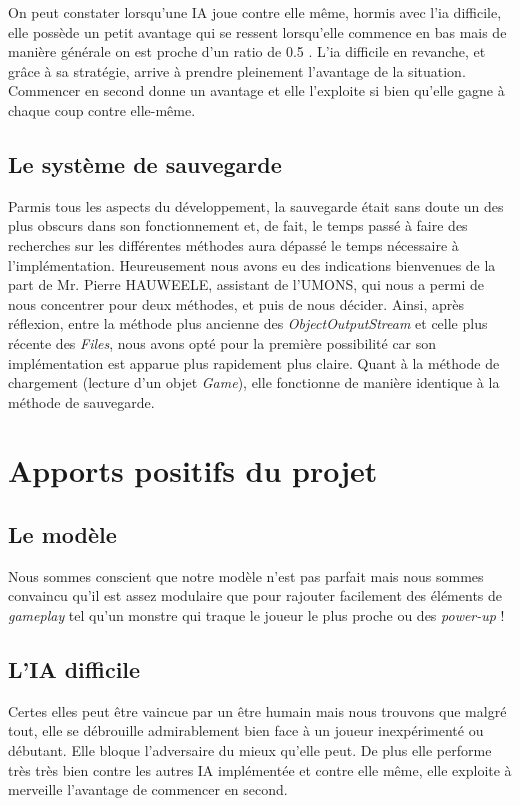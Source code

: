 \documentclass[a4paper, 12pt]{article}
\begin{document}
On peut constater lorsqu'une IA joue contre elle même, hormis avec l'ia difficile, elle possède un petit avantage qui se ressent lorsqu'elle commence en bas mais de manière générale on est proche d'un ratio de 0.5 . L'ia difficile en revanche, et grâce à sa stratégie, arrive à prendre pleinement l'avantage de la situation. Commencer en second donne un avantage et elle l'exploite si bien qu'elle gagne à chaque coup contre elle-même.

\subsection{Le système de sauvegarde}
Parmis tous les aspects du développement, la sauvegarde était sans doute un des plus obscurs dans son fonctionnement et, de fait, le temps passé à faire des recherches sur les différentes méthodes aura dépassé le temps nécessaire à l’implémentation. Heureusement nous avons eu des indications bienvenues de la part de Mr. Pierre HAUWEELE, assistant de l’UMONS, qui nous a permi de nous concentrer pour deux méthodes, et puis de nous décider. Ainsi, après réflexion, entre la méthode plus ancienne des \textit{ObjectOutputStream} et celle plus récente des \textit{Files}, nous avons opté pour la première possibilité car son implémentation est apparue plus rapidement plus claire. Quant à la méthode de chargement (lecture d’un objet \textit{Game}), elle fonctionne de manière identique à la méthode de sauvegarde.


\section{Apports positifs du projet}
\subsection{Le modèle}
Nous sommes conscient que notre modèle n'est pas parfait mais nous sommes convaincu qu'il est assez modulaire que pour rajouter facilement des éléments de \textit{gameplay} tel qu'un monstre qui traque le joueur le plus proche ou des \textit{power-up} !

\subsection{L'IA difficile}
Certes elles peut être vaincue par un être humain mais nous trouvons que malgré tout, elle se débrouille admirablement bien face à un joueur inexpérimenté ou débutant. Elle bloque l'adversaire du mieux qu'elle peut. De plus elle performe très très bien contre les autres IA implémentée et contre elle même, elle exploite à merveille l'avantage de commencer en second.
\end{document}
